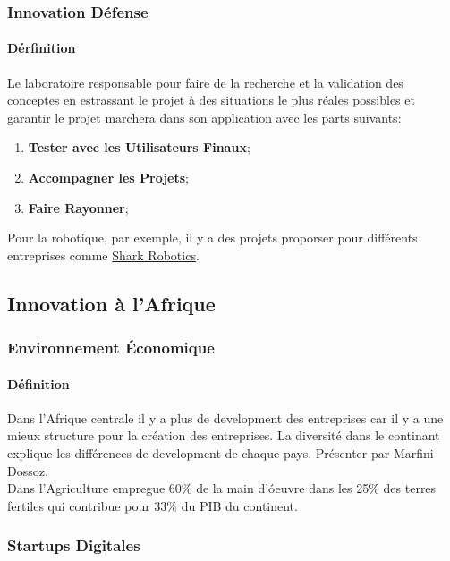 \documentclass{article}
\begin{document}
\subsubsection{Innovation Défense}
\paragraph{Dérfinition}Le laboratoire responsable pour faire de la recherche et la validation des conceptes en estrassant le projet à des situations le plus réales possibles et garantir le projet marchera dans son application avec les parts suivants:
\begin{enumerate}[noitemsep]
    \item \textbf{Tester avec les Utilisateurs Finaux};
    \item \textbf{Accompagner les Projets};
    \item \textbf{Faire Rayonner};
\end{enumerate}
Pour la robotique, par exemple, il y a des projets proporser pour différents entreprises comme \href{https://www.shark-robotics.com/}{Shark Robotics}.


\newpage\subsection{Innovation à l'Afrique}
\subsubsection{Environnement Économique}
\paragraph{Définition}Dans l'Afrique centrale il y a plus de development des entreprises car il y a une mieux structure pour la création des entreprises. La diversité dans le continant explique les différences de development de chaque pays. Présenter par Marfini Dossoz.\\

\noindent Dans l'Agriculture empregue 60\% de la main d'óeuvre dans les 25\% des terres fertiles qui contribue pour 33\% du PIB du continent.

\subsubsection{Startups Digitales}
\end{document}
